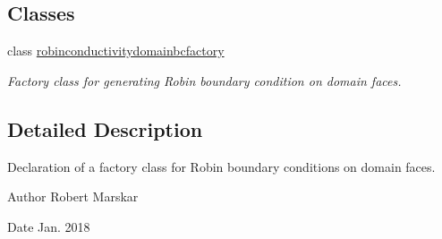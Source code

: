 \subsection*{Classes}
\begin{DoxyCompactItemize}
\item 
class \hyperlink{classrobinconductivitydomainbcfactory}{robinconductivitydomainbcfactory}
\begin{DoxyCompactList}\small\item\em Factory class for generating Robin boundary condition on domain faces. \end{DoxyCompactList}\end{DoxyCompactItemize}


\subsection{Detailed Description}
Declaration of a factory class for Robin boundary conditions on domain faces. 

\begin{DoxyAuthor}{Author}
Robert Marskar 
\end{DoxyAuthor}
\begin{DoxyDate}{Date}
Jan. 2018 
\end{DoxyDate}
